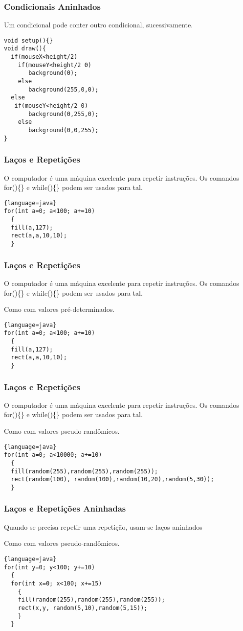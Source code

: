 \documentclass{beamer}
\begin{document}
\begin{frame}[fragile]
\frametitle{Condicionais Aninhados}
Um condicional pode conter outro condicional, sucessivamente. 
\begin{lstlisting}
void setup(){}
void draw(){
  if(mouseX<height/2)
    if(mouseY<height/2 0)
       background(0);
    else 
       background(255,0,0);
  else
   if(mouseY<height/2 0)
       background(0,255,0);
    else 
       background(0,0,255);
}
\end{lstlisting}
\end{frame}

\begin{frame}[fragile]
\frametitle{Laços e Repetições}
O computador é uma máquina excelente para repetir instruções.
Os comandos for()\{\} e while()\{\} podem ser usados para tal.
\begin{lstlisting}{language=java}
for(int a=0; a<100; a+=10)
  {
  fill(a,127);
  rect(a,a,10,10);
  } 
\end{lstlisting}
\end{frame}

\begin{frame}[fragile]
\frametitle{Laços e Repetições}
O computador é uma máquina excelente para repetir instruções.
Os comandos for()\{\} e while()\{\} podem ser usados para tal.

Como com valores pré-determinados.
\begin{lstlisting}{language=java}
for(int a=0; a<100; a+=10)
  {
  fill(a,127);
  rect(a,a,10,10);
  } 
\end{lstlisting}
\end{frame}

\begin{frame}[fragile]
\frametitle{Laços e Repetições}
O computador é uma máquina excelente para repetir instruções.
Os comandos for()\{\} e while()\{\} podem ser usados para tal.

Como com valores pseudo-randômicos.
\begin{lstlisting}{language=java}
for(int a=0; a<10000; a+=10)
  {
  fill(random(255),random(255),random(255));
  rect(random(100), random(100),random(10,20),random(5,30));
  } 
\end{lstlisting}
\end{frame}

\begin{frame}[fragile]
\frametitle{Laços e Repetições Aninhadas}
Quando se precisa repetir uma repetição,
usam-se laços aninhados

Como com valores pseudo-randômicos.
\begin{lstlisting}{language=java}
for(int y=0; y<100; y+=10)
  {
  for(int x=0; x<100; x+=15)
    {
    fill(random(255),random(255),random(255));
    rect(x,y, random(5,10),random(5,15));
    }
  }
\end{lstlisting}
\end{frame}
\end{document}
